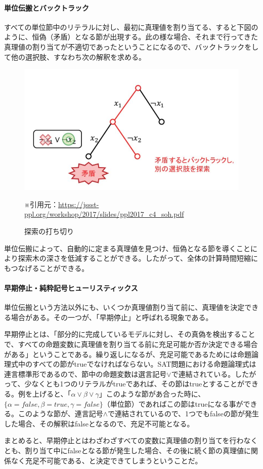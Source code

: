 \documentclass[dvipdfmx]{jsarticle}
\begin{document}
\paragraph{単位伝搬とバックトラック}
すべての単位節中のリテラルに対し、最初に真理値を割り当てる、すると下図のように、恒偽（矛盾）となる節が出現する。此の様な場合、それまで行ってきた真理値の割り当てが不適切であったということになるので、バックトラックをして他の選択肢、すなわち次の解釈を求める。
\begin{figure}[H]
  \centering
  \includegraphics[scale=0.6]{cap3.JPG}
  \caption{探索の打ち切り}
  ※引用元：\url{https://jssst-ppl.org/workshop/2017/slides/ppl2017_c4_soh.pdf}
\end{figure}
単位伝搬によって、自動的に定まる真理値を見つけ、恒偽となる節を導くことにより探索木の深さを低減することができる。したがって、全体の計算時間短縮にもつなげることができる。
\paragraph{早期停止・純粋記号ヒューリスティックス}
単位伝搬という方法以外にも、いくつか真理値割り当て前に、真理値を決定できる場合がある。その一つが、「早期停止」と呼ばれる現象である。\par
早期停止とは、「部分的に完成しているモデルに対し、その真偽を検出することで、すべての命題変数に真理値を割り当てる前に充足可能か否か決定できる場合がある」ということである。繰り返しになるが、充足可能であるためには命題論理式中のすべての節がtrueでなければならない。SAT問題における命題論理式は連言標準形であるので、節中の命題変数は選言記号$\vee$で連結されている。したがって、少なくとも1つのリテラルがtrueであれば、その節はtrueとすることができる。例を上げると、「$\alpha \vee \beta \vee \gamma$」このような節があ合った時に、$\{\alpha=false, \beta=true, \gamma=false\}（単位節）$であればこの節はtrueになる事ができる。このような節が、連言記号$\wedge$で連結されているので、1つでもfalseの節が発生した場合、その解釈はfalseとなるので、充足不可能となる。\par
まとめると、早期停止とはわざわざすべての変数に真理値の割り当てを行わなくとも、割り当て中にfalseとなる節が発生した場合、その後に続く節の真理値に関係なく充足不可能である、と決定できてしまうということだ。
\end{document}
